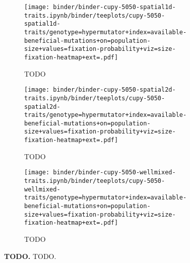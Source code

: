 \begin{sidewaysfigure}[h]
  \rotatesidewayslabel
    \begin{subfigure}[b]{0.33\linewidth}
        \begin{minipage}{\linewidth}
          \texttt{[image: binder/binder-cupy-5050-spatial1d-traits.ipynb/binder/teeplots/cupy-5050-spatial1d-traits/genotype=hypermutator+index=available-beneficial-mutations+on=population-size+values=fixation-probability+viz=size-fixation-heatmap+ext=.pdf]}%
        \end{minipage}
        \begin{minipage}{\linewidth}
        \caption{TODO}
        \label{fig:fixheat-5050-cupy:spatial1d}
        \end{minipage}%
    \end{subfigure}%
    \begin{subfigure}[b]{0.32\linewidth}
        \begin{minipage}{\linewidth}
          \texttt{[image: binder/binder-cupy-5050-spatial2d-traits.ipynb/binder/teeplots/cupy-5050-spatial2d-traits/genotype=hypermutator+index=available-beneficial-mutations+on=population-size+values=fixation-probability+viz=size-fixation-heatmap+ext=.pdf]}%
        \end{minipage}
        \begin{minipage}{\linewidth}
        \caption{TODO}
        \label{fig:fixheat-5050-cupy:spatial2d}
        \end{minipage}%
    \end{subfigure}%
\begin{subfigure}[b]{0.35\linewidth}
    \begin{minipage}{\linewidth}
          \texttt{[image: binder/binder-cupy-5050-wellmixed-traits.ipynb/binder/teeplots/cupy-5050-wellmixed-traits/genotype=hypermutator+index=available-beneficial-mutations+on=population-size+values=fixation-probability+viz=size-fixation-heatmap+ext=.pdf]}%
    \end{minipage}
    \begin{minipage}{\linewidth}
    \caption{TODO}
    \label{fig:fixheat-5050-cupy:wellmixed}
    \end{minipage}%
\end{subfigure}%


  \begin{minipage}{\linewidth}
    \caption{%
      \textbf{TODO.}
      \footnotesize
     TODO.
    }
    \label{fig:fixheat-5050-cupy}
  \end{minipage}
\end{sidewaysfigure}
